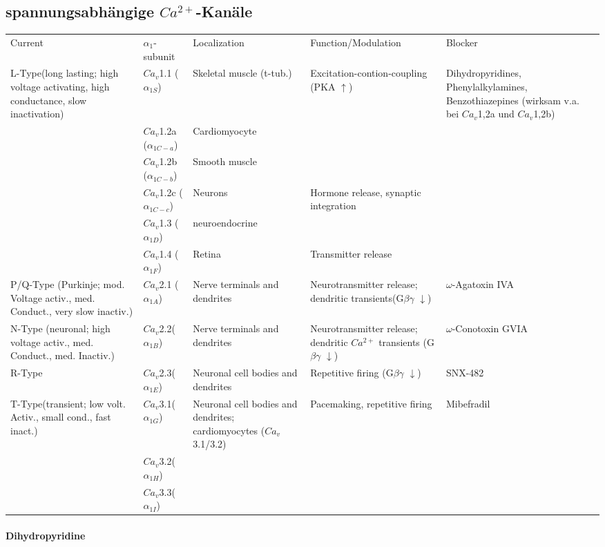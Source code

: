 \documentclass[10pt,a4paper]{report}
\begin{document}
\subsection{spannungsabhängige $Ca^{2+}$-Kanäle}
\begin{tabularx}{\textwidth}{XXXXX}
Current&$\alpha_1$-subunit&Localization&Function/Modulation&Blocker\\
L-Type(long lasting; high voltage activating, high conductance, slow inactivation)&$Ca_v$1.1 ($\alpha_{1S}$)&Skeletal muscle (t-tub.)&Excitation-contion-coupling
(PKA $\uparrow$)&Dihydropyridines, Phenylalkylamines, Benzothiazepines (wirksam v.a. bei $Ca_v$1,2a und $Ca_v$1,2b)\\
&$Ca_v$1.2a ($\alpha_{1C-a}$)&Cardiomyocyte&&\\
&$Ca_v$1.2b ($\alpha_{1C-b}$)&Smooth muscle&&\\
&$Ca_v$1.2c ($\alpha_{1C-c}$)&Neurons&Hormone release, synaptic integration&\\
&$Ca_v$1.3 ($\alpha_{1D}$)&neuroendocrine&&\\
&$Ca_v$1.4 ($\alpha_{1F}$)&Retina&Transmitter release&\\
P/Q-Type (Purkinje; mod. Voltage activ., med. Conduct., very slow inactiv.)&$Ca_v$2.1 ($\alpha_{1A}$)&Nerve terminals and dendrites&Neurotransmitter release; dendritic  transients(G$\beta\gamma$ $\downarrow$)&$\omega$-Agatoxin IVA\\
N-Type (neuronal; high voltage activ., med. Conduct., med. Inactiv.)&$Ca_v$2.2($\alpha_{1B}$)&Nerve terminals and dendrites&Neurotransmitter release; dendritic $Ca^{2+}$ transients (G$\beta\gamma$ $\downarrow$)&$\omega$-Conotoxin GVIA\\
R-Type&$Ca_v$2.3($\alpha_{1E}$)&Neuronal cell bodies and dendrites&Repetitive firing (G$\beta\gamma$ $\downarrow$)&SNX-482\\
T-Type(transient; low volt. Activ., small cond., fast inact.)&$Ca_v$3.1($\alpha_{1G}$)&Neuronal cell bodies and dendrites; cardiomyocytes ($Ca_v$3.1/3.2)&Pacemaking, repetitive firing&Mibefradil\\
&$Ca_v$3.2($\alpha_{1H}$)&&&\\
&$Ca_v$3.3($\alpha_{1I}$)&&&\\
\end{tabularx}

\paragraph{Dihydropyridine}
\end{document}
